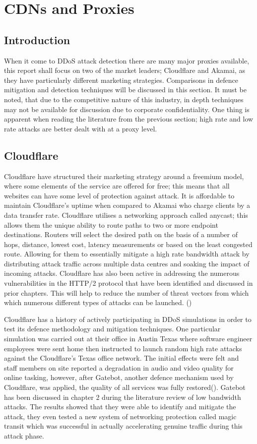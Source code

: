\section{CDNs and Proxies}
\subsection{Introduction}
When it come to DDoS attack detection there are many major proxies available, this report shall focus on two of the market leaders; Cloudflare and Akamai, as they have particularly different marketing strategies. Comparisons in defence mitigation and detection techniques will be discussed in this section. It must be noted, that due to the competitive nature of this industry, in depth techniques may not be available for discussion due to corporate confidentiality. One thing is apparent when reading the literature from the previous section; high rate and low rate attacks are better dealt with at a proxy level.
\subsection{Cloudflare}
Cloudflare have structured their marketing strategy around a freemium model, where some elements of the service are offered for free; this means that all websites can have some level of protection against attack. It is affordable to maintain Cloudflare's uptime when compared to Akamai who charge clients by a data transfer rate. Cloudflare utilises a networking approach called anycast; this allows them the unique ability to route paths to two or more endpoint destinations. Routers will select the desired path on the basis of a number of hops, distance, lowest cost, latency measurements or based on the least congested route. Allowing for them to essentially mitigate a high rate bandwidth attack by distributing attack traffic across multiple data centres and soaking the impact of incoming attacks. Cloudflare has also been active in addressing the numerous vulnerabilities in the HTTP/2 protocol that have been identified and discussed in prior chapters. This will help to reduce the number of threat vectors from which which numerous different types of attacks can be launched.  (\cite{CFHTTP2})

Cloudflare has a history of actively participating in DDoS simulations in order to test its defence methodology and mitigation techniques. One particular simulation was carried out at their office in Austin Texas where software engineer employees were sent home then instructed to launch random high rate attacks against the Cloudflare's Texas office network. The initial effects were felt and staff members on site reported a degradation in audio and video quality for online tasking, however, after Gatebot, another defence mechanism used by Cloudflare, was applied, the quality of all services was fully restored(\cite{CFAustin}). Gatebot has been discussed in chapter 2 during the literature review of low bandwidth attacks. The results showed that they were able to identify and mitigate the attack, they even tested a new system of networking protection called magic transit which was successful in actually accelerating genuine traffic during this attack phase.

